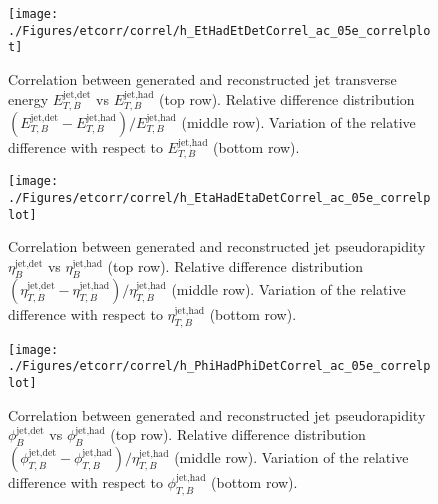 \begin{figure}[p]
	\centering	\texttt{[image: ./Figures/etcorr/correl/h\_EtHadEtDetCorrel\_ac\_05e\_correlplot]}
	\caption{Correlation between generated and reconstructed jet transverse energy $E_{T,B}^\text{jet,det}$ vs $E_{T,B}^\text{jet,had}$ (top row). Relative difference distribution $\left(E_{T,B}^\text{jet,det} - E_{T,B}^\text{jet,had}\right)/E_{T,B}^\text{jet,had}$ (middle row). Variation of the relative difference with respect to $E_{T,B}^\text{jet,had}$ (bottom row).}
	\label{fig:h_EtHadEtDetCorrel_05e_correlplot}
\end{figure}

\begin{figure}[p]
	\centering	\texttt{[image: ./Figures/etcorr/correl/h\_EtaHadEtaDetCorrel\_ac\_05e\_correlplot]}
	\caption{Correlation between generated and reconstructed jet pseudorapidity $\eta_{B}^\text{jet,det}$ vs $\eta_{B}^\text{jet,had}$ (top row). Relative difference distribution $\left(\eta_{T,B}^\text{jet,det} - \eta_{T,B}^\text{jet,had}\right)/\eta_{T,B}^\text{jet,had}$ (middle row). Variation of the relative difference with respect to $\eta_{T,B}^\text{jet,had}$ (bottom row).}
	\label{fig:h_EtaHadEtDetCorrel_05e_correlplot}
\end{figure}

\begin{figure}[p]
	\centering	\texttt{[image: ./Figures/etcorr/correl/h\_PhiHadPhiDetCorrel\_ac\_05e\_correlplot]}
	\caption{Correlation between generated and reconstructed jet pseudorapidity $\phi_{B}^\text{jet,det}$ vs $\phi_{B}^\text{jet,had}$ (top row). Relative difference distribution $\left(\phi_{T,B}^\text{jet,det} - \phi_{T,B}^\text{jet,had}\right)/\eta_{T,B}^\text{jet,had}$ (middle row). Variation of the relative difference with respect to $\phi_{T,B}^\text{jet,had}$ (bottom row).}
	\label{fig:h_PhiHadEtDetCorrel_05e_correlplot}
\end{figure}